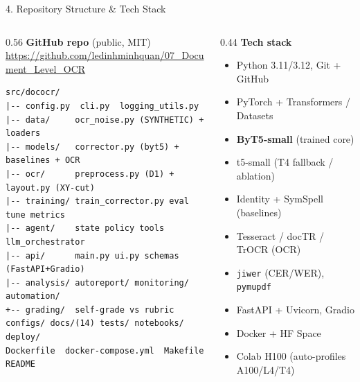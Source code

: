 \documentclass[10pt,aspectratio=169]{beamer}
\begin{document}
\begin{frame}[fragile]{4. Repository Structure \& Tech Stack}
\begin{columns}[T]
\begin{column}{0.56\textwidth}
\textbf{GitHub repo} (public, MIT) \\
\scriptsize \url{https://github.com/ledinhminhquan/07_Document_Level_OCR}

\vspace{0.15cm}
\begin{lstlisting}[basicstyle=\ttfamily\tiny]
src/dococr/
|-- config.py  cli.py  logging_utils.py
|-- data/     ocr_noise.py (SYNTHETIC) + loaders
|-- models/   corrector.py (byt5) + baselines + OCR
|-- ocr/      preprocess.py (D1) + layout.py (XY-cut)
|-- training/ train_corrector.py eval tune metrics
|-- agent/    state policy tools llm_orchestrator
|-- api/      main.py ui.py schemas (FastAPI+Gradio)
|-- analysis/ autoreport/ monitoring/ automation/
+-- grading/  self-grade vs rubric
configs/ docs/(14) tests/ notebooks/ deploy/
Dockerfile  docker-compose.yml  Makefile  README
\end{lstlisting}
\end{column}
\begin{column}{0.44\textwidth}
\textbf{Tech stack}
\begin{itemize}\small
  \item Python 3.11/3.12, Git + GitHub
  \item PyTorch + Transformers / Datasets
  \item \textbf{ByT5-small} (trained core)
  \item t5-small (T4 fallback / ablation)
  \item Identity + SymSpell (baselines)
  \item Tesseract / docTR / TrOCR (OCR)
  \item \texttt{jiwer} (CER/WER), \texttt{pymupdf}
  \item FastAPI + Uvicorn, Gradio
  \item Docker + HF Space
  \item Colab H100 (auto-profiles A100/L4/T4)
\end{itemize}
\end{column}
\end{columns}
\end{frame}
\end{document}
